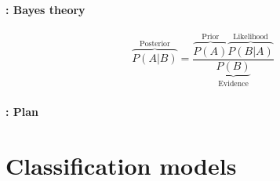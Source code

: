 \documentclass[xcolor=table]{beamer}
\subtitle[Naïve Bayes]{Naïve Bayes}
\begin{document}
\begin{frame}
	\frametitle{\inserttitle}
	\framesubtitle{\insertshortsubtitle: Bayes theory}
	\huge
	\[
	\overbrace{P(A|B)}^\text{Posterior} = \frac{\overbrace{P(A)}^\text{Prior} \overbrace{P(B|A)}^{\text{Likelihood}}}{\underbrace{P(B)}_\text{Evidence}}
	\]
\end{frame}

\begin{frame}
	\frametitle{\inserttitle}
	\framesubtitle{\insertshortsubtitle: Plan}

	\begin{multicols}{2}
		\tableofcontents
	\end{multicols}
\end{frame}

\section{Classification models}
\end{document}
